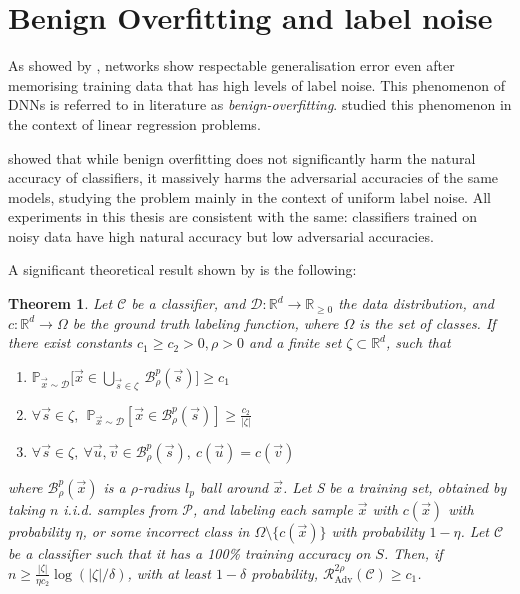 \documentclass{ociamthesis}
\newtheorem{theorem}{Theorem}
\begin{document}


\section{Benign Overfitting and label noise}
\label{section:benign}
As showed by \citet{DBLP:journals/cacm/ZhangBHRV21}, networks show respectable
generalisation error even after memorising training data that has high levels of
label noise. This phenomenon of DNNs is referred to in literature as
\emph{benign-overfitting}. \citet{bartlett2020benign} studied this phenomenon in
the context of linear regression problems.

\citet{sanyal2021how} showed that while benign overfitting does not
significantly harm the natural accuracy of classifiers, it massively harms the
adversarial accuracies of the same models, studying the problem mainly in the
context of uniform label noise. All experiments in this thesis are consistent
with the same: classifiers trained on noisy data have high natural accuracy but
low adversarial accuracies.

A significant theoretical result shown by \citet{sanyal2021how} is the
following:

\begin{theorem}
    \label{theorem:how-benign-bo}
    Let $\mathcal{C}$ be a classifier, and $\mathcal{D}: \mathbb{R}^d \to
    \mathbb{R}_{\geq 0}$ the data distribution, and $c: \mathbb{R}^d \to \Omega$
    be the ground truth labeling function, where $\Omega$ is the set of classes.
    If there exist constants $c_1 \geq c_2 > 0, \rho > 0$ and a finite set
    $\zeta \subset \mathbb{R}^d$, such that
    \begin{enumerate}
        \item $\mathbb{P}_{\vec{x} \sim \mathcal{D}} \bigg [\vec{x} \in
        \underset{\vec{s} \in \zeta}{\bigcup}~\mathcal{B}_\rho^p(\vec{s}) \bigg]
        \geq c_1$
        \item $\forall \vec{s} \in \zeta,~~ \mathbb{P}_{\vec{x} \sim
        \mathcal{D}} [\vec{x} \in \mathcal{B}_\rho^p(\vec{s})] \geq
        \frac{c_2}{|\zeta|}$
        \item $\forall \vec{s} \in \zeta,~\forall \vec{u}, \vec{v} \in
        \mathcal{B}_\rho^p(\vec{s}),~c(\vec{u}) = c(\vec{v})$
    \end{enumerate}
    where $\mathcal{B}^p_\rho(\vec{x})$ is a $\rho$-radius $l_p$ ball around
    $\vec{x}$. Let S be a training set, obtained by taking $n$ i.i.d. samples
    from $\mathcal{P}$, and labeling each sample $\vec{x}$ with $c(\vec{x})$
    with probability $\eta$, or some incorrect class in $\Omega \setminus
    \{c(\vec{x})\}$ with probability $1-\eta$. Let $\mathcal{C}$ be a classifier
    such that it has a 100\% training accuracy on $S$. Then, if $n \geq
    \frac{|\zeta|}{\eta c_2} \log (|\zeta|/\delta)$, with at least $1-\delta$
    probability, $\mathcal{R}_{\text{Adv}}^{2\rho}(\mathcal{C}) \geq c_1$.
\end{theorem}
\end{document}
